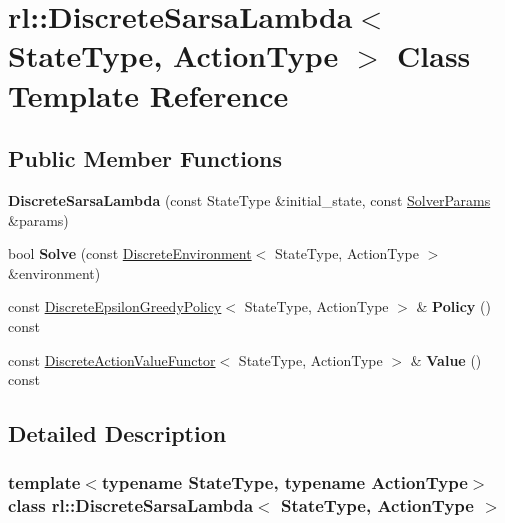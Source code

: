 \hypertarget{classrl_1_1_discrete_sarsa_lambda}{}\section{rl\+:\+:Discrete\+Sarsa\+Lambda$<$ State\+Type, Action\+Type $>$ Class Template Reference}
\label{classrl_1_1_discrete_sarsa_lambda}
\subsection*{Public Member Functions}
\begin{DoxyCompactItemize}
\item 
\hypertarget{classrl_1_1_discrete_sarsa_lambda_aab5a458bbbfb8c30b26fa82059e1fb40}{}\label{classrl_1_1_discrete_sarsa_lambda_aab5a458bbbfb8c30b26fa82059e1fb40} 
{\bfseries Discrete\+Sarsa\+Lambda} (const State\+Type \&initial\+\_\+state, const \hyperlink{structrl_1_1_solver_params}{Solver\+Params} \&params)
\item 
\hypertarget{classrl_1_1_discrete_sarsa_lambda_a622e3b6761479b7487a57c730d522ca3}{}\label{classrl_1_1_discrete_sarsa_lambda_a622e3b6761479b7487a57c730d522ca3} 
bool {\bfseries Solve} (const \hyperlink{classrl_1_1_discrete_environment}{Discrete\+Environment}$<$ State\+Type, Action\+Type $>$ \&environment)
\item 
\hypertarget{classrl_1_1_discrete_sarsa_lambda_af6d5b91b1b9c27d11e299fff4e500e25}{}\label{classrl_1_1_discrete_sarsa_lambda_af6d5b91b1b9c27d11e299fff4e500e25} 
const \hyperlink{classrl_1_1_discrete_epsilon_greedy_policy}{Discrete\+Epsilon\+Greedy\+Policy}$<$ State\+Type, Action\+Type $>$ \& {\bfseries Policy} () const
\item 
\hypertarget{classrl_1_1_discrete_sarsa_lambda_a1098971513a37f2816140c2d2d0ac232}{}\label{classrl_1_1_discrete_sarsa_lambda_a1098971513a37f2816140c2d2d0ac232} 
const \hyperlink{structrl_1_1_discrete_action_value_functor}{Discrete\+Action\+Value\+Functor}$<$ State\+Type, Action\+Type $>$ \& {\bfseries Value} () const
\end{DoxyCompactItemize}


\subsection{Detailed Description}
\subsubsection*{template$<$typename State\+Type, typename Action\+Type$>$\newline
class rl\+::\+Discrete\+Sarsa\+Lambda$<$ State\+Type, Action\+Type $>$}



